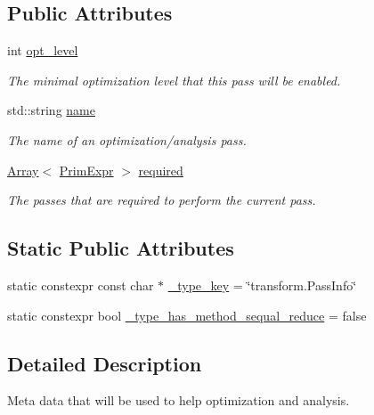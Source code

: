 \subsection*{Public Attributes}
\begin{DoxyCompactItemize}
\item 
int \hyperlink{classtvm_1_1transform_1_1PassInfoNode_a8e22e5767cd899bb9aef1ee1c529a2a7}{opt\+\_\+level}
\begin{DoxyCompactList}\small\item\em The minimal optimization level that this pass will be enabled. \end{DoxyCompactList}\item 
std\+::string \hyperlink{classtvm_1_1transform_1_1PassInfoNode_a29ef9f45e08c32e691cef46eb858dbe7}{name}
\begin{DoxyCompactList}\small\item\em The name of an optimization/analysis pass. \end{DoxyCompactList}\item 
\hyperlink{classtvm_1_1Array}{Array}$<$ \hyperlink{classtvm_1_1PrimExpr}{Prim\+Expr} $>$ \hyperlink{classtvm_1_1transform_1_1PassInfoNode_a9af9278b785b3c11b90b00640f68dc87}{required}
\begin{DoxyCompactList}\small\item\em The passes that are required to perform the current pass. \end{DoxyCompactList}\end{DoxyCompactItemize}
\subsection*{Static Public Attributes}
\begin{DoxyCompactItemize}
\item 
static constexpr const char $\ast$ \hyperlink{classtvm_1_1transform_1_1PassInfoNode_a78c9eca9534883355d96eb0cd1fb8816}{\+\_\+type\+\_\+key} = \char`\"{}transform.\+Pass\+Info\char`\"{}
\item 
static constexpr bool \hyperlink{classtvm_1_1transform_1_1PassInfoNode_a41087cffcece669d267f137ad30a5404}{\+\_\+type\+\_\+has\+\_\+method\+\_\+sequal\+\_\+reduce} = false
\end{DoxyCompactItemize}


\subsection{Detailed Description}
Meta data that will be used to help optimization and analysis. 


